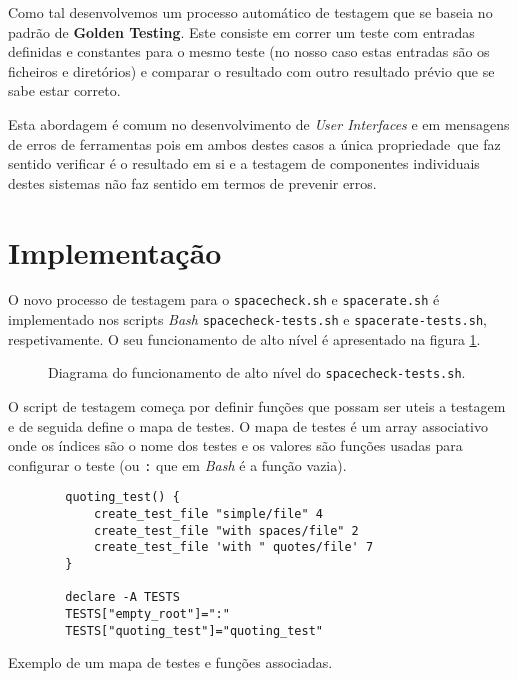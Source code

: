 Como tal desenvolvemos um processo automático de testagem que se baseia no
padrão de \textbf{Golden Testing}\cite{goldenTestsAreTasty}.
Este consiste em correr um teste com entradas
definidas e constantes para o mesmo teste (no nosso caso estas entradas são os
ficheiros e diretórios) e comparar o resultado com outro resultado prévio que se
sabe estar correto.

Esta abordagem é comum no desenvolvimento de \emph{User Interfaces}
\cite{ebayScreenshotTesting} e em mensagens de erros de ferramentas
\cite{brsonRustTested} pois em ambos destes casos a única propriedade\ que faz
sentido verificar é o resultado em si e a testagem de componentes individuais
destes sistemas não faz sentido em termos de prevenir erros.

\section{Implementação}

O novo processo de testagem para o \Verb|spacecheck.sh| e \Verb|spacerate.sh|
é implementado nos scripts \emph{Bash} \Verb|spacecheck-tests.sh| e
\Verb|spacerate-tests.sh|, respetivamente. O seu funcionamento de alto nível é
apresentado na figura \ref{fig:testing_diagram}.

\begin{figure}[H]
	\centering
	\begin{tikzpicture}[node distance=2cm]
		
	\end{tikzpicture}
	\cprotect\caption{Diagrama do funcionamento de alto nível do \Verb|spacecheck-tests.sh|.}
	\label{fig:testing_diagram}
\end{figure}

\newpage

O script de testagem começa por definir funções que possam ser uteis a testagem
e de seguida define o mapa de testes. O mapa de testes é um array associativo
onde os índices são o nome dos testes e os valores são funções usadas para
configurar o teste (ou \Verb|:| que em \emph{Bash} é a função vazia).


\begin{listing}[H]
	\centering
	\begin{verbatim}
		quoting_test() {
			create_test_file "simple/file" 4
			create_test_file "with spaces/file" 2
			create_test_file 'with " quotes/file' 7
		}

		declare -A TESTS
		TESTS["empty_root"]=":"
		TESTS["quoting_test"]="quoting_test"
	\end{verbatim}
	\cprotect\caption{Exemplo de um mapa de testes e funções associadas.}
\end{listing}

